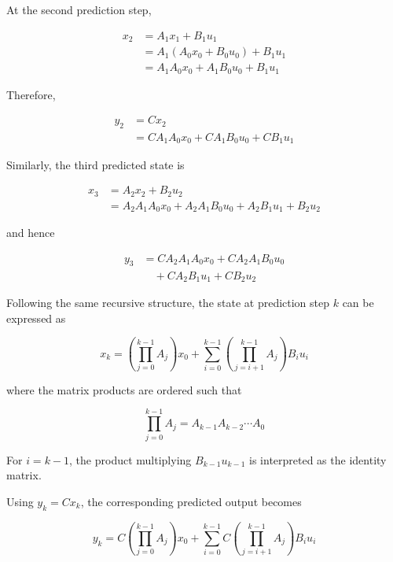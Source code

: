 At the second prediction step,

\begin{align}
    x_2
    &= A_1x_1+B_1u_1 \\
    &= A_1(A_0x_0+B_0u_0)+B_1u_1 \\
    &= A_1A_0x_0+A_1B_0u_0+B_1u_1
\end{align}

Therefore,

\begin{align}
    y_2
    &= Cx_2 \\
    &= CA_1A_0x_0
    +CA_1B_0u_0
    +CB_1u_1
    \label{eq:bilinear_y2}
\end{align}

Similarly, the third predicted state is

\begin{align}
    x_3
    &=
    A_2x_2+B_2u_2 \\
    &=
    A_2A_1A_0x_0
    +A_2A_1B_0u_0
    +A_2B_1u_1
    +B_2u_2
\end{align}

and hence

\begin{align}
    y_3
    &=
    CA_2A_1A_0x_0
    +CA_2A_1B_0u_0 \nonumber\\
    &\quad
    +CA_2B_1u_1
    +CB_2u_2
\end{align}

Following the same recursive structure, the state at prediction step \(k\) can be expressed as

\begin{equation}
    x_k
    =
    \left(
        \prod_{j=0}^{k-1} A_j
    \right)x_0
    +
    \sum_{i=0}^{k-1}
    \left(
        \prod_{j=i+1}^{k-1} A_j
    \right)
    B_i u_i
    \label{eq:bilinear_xk}
\end{equation}

where the matrix products are ordered such that

\begin{equation}
    \prod_{j=0}^{k-1}A_j
    =
    A_{k-1}A_{k-2}\cdots A_0
\end{equation}

For \(i=k-1\), the product multiplying \(B_{k-1}u_{k-1}\) is interpreted as the identity matrix.

Using \(y_k=Cx_k\), the corresponding predicted output becomes

\begin{equation}
    y_k
    =
    C
    \left(
        \prod_{j=0}^{k-1} A_j
    \right)x_0
    +
    \sum_{i=0}^{k-1}
    C
    \left(
        \prod_{j=i+1}^{k-1} A_j
    \right)
    B_i u_i
    \label{eq:bilinear_yk}
\end{equation}

